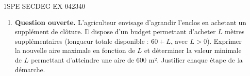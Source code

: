 \begin{exercice}{1SPE-SECDEG-EX-042}{3}{40}
\begin{enumerate}
  \item \textbf{Question ouverte.} L'agriculteur envisage d'agrandir l'enclos en achetant un supplément de clôture. Il dispose d'un budget permettant d'acheter $L$ mètres supplémentaires (longueur totale disponible : $60 + L$, avec $L > 0$). Exprimer la nouvelle aire maximale en fonction de $L$ et déterminer la valeur minimale de $L$ permettant d'atteindre une aire de $600$ m². Justifier chaque étape de la démarche.
\end{enumerate}
\end{exercice}
